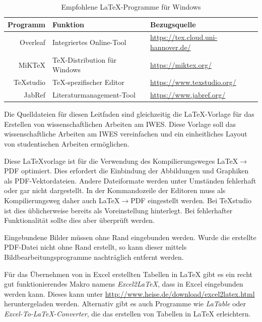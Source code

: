 \begin{table}[!htbp]
\normalsize
  \centering
  \caption[Empfohlene \LaTeX{}-Programme für Windows-Systeme.]{Empfohlene \LaTeX{}-Programme für Windows}
    \begin{tabular}{rll}
    	\toprule
    	\textbf{Programm} & \textbf{Funktion} & \textbf{Bezugsquelle} \\
    	\midrule
		Overleaf & Integriertes Online-Tool & \url{https://tex.cloud.uni-hannover.de/}\\
    	MiKTeX & TeX-Distribution für Windows & \url{https://miktex.org/} \\
		TeXstudio & TeX-spezifischer Editor & \url{https://www.texstudio.org/} \\
		JabRef & Literaturmanagement-Tool & \url{https://www.jabref.org/} \\
		\bottomrule
    \end{tabular}%
  \label{tab:programme}%
\end{table}%

Die Quelldateien für diesen Leitfaden sind gleichzeitig die \LaTeX{}-Vorlage für das Erstellen von wissenschaftlichen Arbeiten am IWES. Diese Vorlage soll das wissenschaftliche Arbeiten am IWES vereinfachen und ein einheitliches Layout von studentischen Arbeiten ermöglichen.

Diese \LaTeX{}vorlage ist für die Verwendung des Kompilierungsweges \LaTeX{}$\rightarrow$PDF optimiert. Dies erfordert die Einbindung der Abbildungen und Graphiken als PDF-Vektordateien. Andere Dateiformate werden unter Umständen fehlerhaft oder gar nicht dargestellt. In der Kommandozeile der Editoren muss als Kompilierungsweg daher auch \LaTeX{}$\rightarrow$PDF eingestellt werden. Bei TeXstudio ist dies üblicherweise bereits als Voreinstellung hinterlegt. Bei fehlerhafter Funktionalität sollte dies aber überprüft werden.

Eingebundene Bilder müssen ohne Rand eingebunden werden. Wurde die erstellte PDF-Datei nicht ohne Rand erstellt, so kann dieser mittels Bildbearbeitungsprogramme nachträglich entfernt werden.

Für das Übernehmen von in Excel erstellten Tabellen in \LaTeX{} gibt es ein recht gut funktionierendes Makro namens \textit{Excel2LaTeX}, dass in Excel eingebunden werden kann. Dieses kann unter  \url{http://www.heise.de/download/excel2latex.html} heruntergeladen werden. Alternativ gibt es auch Programme wie \textit{LaTable} oder \textit{Excel-To-LaTeX-Converter}, die das erstellen von Tabellen in \LaTeX{} erleichtern.

